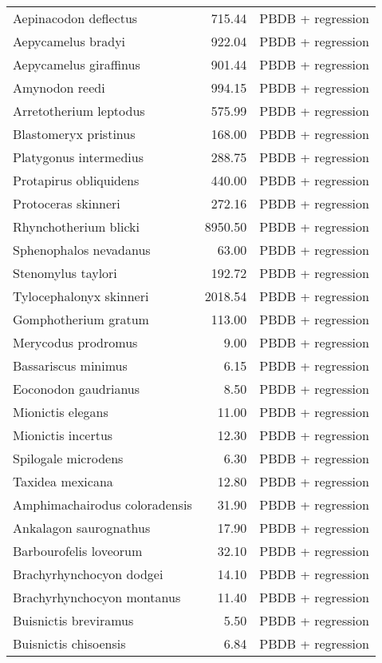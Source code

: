 \begin{table}[ht]
\begin{tabular}{lrl}
  Aepinacodon deflectus & 715.44 & PBDB + regression \\ 
  Aepycamelus bradyi & 922.04 & PBDB + regression \\ 
  Aepycamelus giraffinus & 901.44 & PBDB + regression \\ 
  Amynodon reedi & 994.15 & PBDB + regression \\ 
  Arretotherium leptodus & 575.99 & PBDB + regression \\ 
  Blastomeryx pristinus & 168.00 & PBDB + regression \\ 
  Platygonus intermedius & 288.75 & PBDB + regression \\ 
  Protapirus obliquidens & 440.00 & PBDB + regression \\ 
  Protoceras skinneri & 272.16 & PBDB + regression \\ 
  Rhynchotherium blicki & 8950.50 & PBDB + regression \\ 
  Sphenophalos nevadanus & 63.00 & PBDB + regression \\ 
  Stenomylus taylori & 192.72 & PBDB + regression \\ 
  Tylocephalonyx skinneri & 2018.54 & PBDB + regression \\ 
  Gomphotherium gratum & 113.00 & PBDB + regression \\ 
  Merycodus prodromus & 9.00 & PBDB + regression \\ 
  Bassariscus minimus & 6.15 & PBDB + regression \\ 
  Eoconodon gaudrianus & 8.50 & PBDB + regression \\ 
  Mionictis elegans & 11.00 & PBDB + regression \\ 
  Mionictis incertus & 12.30 & PBDB + regression \\ 
  Spilogale microdens & 6.30 & PBDB + regression \\ 
  Taxidea mexicana & 12.80 & PBDB + regression \\ 
  Amphimachairodus coloradensis & 31.90 & PBDB + regression \\ 
  Ankalagon saurognathus & 17.90 & PBDB + regression \\ 
  Barbourofelis loveorum & 32.10 & PBDB + regression \\ 
  Brachyrhynchocyon dodgei & 14.10 & PBDB + regression \\ 
  Brachyrhynchocyon montanus & 11.40 & PBDB + regression \\ 
  Buisnictis breviramus & 5.50 & PBDB + regression \\ 
  Buisnictis chisoensis & 6.84 & PBDB + regression \\ 

\end{tabular}
\end{table}
